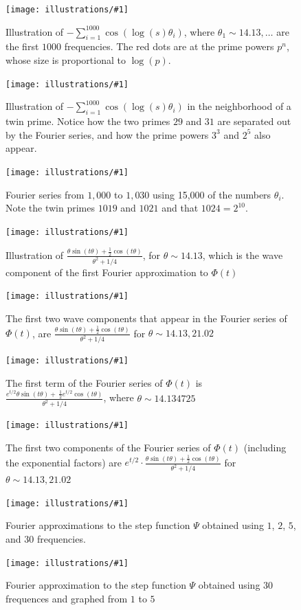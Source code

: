 \documentclass[11pt]{article}
\newcommand{\ill}[3]{ 
   \begin{figure}[H]
   \begin{center}
   \texttt{[image: illustrations/\#1]}
   \caption{#3}
   \end{center}
    \end{figure}
}
\theoremstyle{plain}
\theoremstyle{definition}
\numberwithin{equation}{section}
\numberwithin{figure}{section}
\numberwithin{table}{section}
\begin{document}
\begin{itemize}
{\bigskip

\ill{phi_cos_sum_2_30_1000}{.8}{Illustration of $-\sum_{i=1}^{1000} \cos(\log(s)\theta_i)$, where
$\theta_1 \sim 14.13, \ldots$ are the first $1000$ frequencies.  The red
dots are at the prime powers $p^n$, whose size is proportional to $\log(p)$.}

\ill{phi_cos_sum_26_34_1000}{.8}{Illustration of $-\sum_{i=1}^{1000} \cos(\log(s)\theta_i)$ in the
neighborhood of a twin prime.  Notice how the two primes $29$ and $31$ are separated out
by the Fourier series, and how the prime powers $3^3$ and $2^5$ also appear.}

\ill{phi_cos_sum_1010_1026_15000}{.7}{Fourier series from $1,000$ to $1,030$ using 15,000 of the numbers $\theta_i$.  Note the twin primes $1019$ and $1021$ and that $1024=2^{10}$.}

 

 
 \ill{psi_just_waves1}{0.7}{Illustration of 
$\displaystyle\frac{\theta\sin(t\theta) + \frac{1}{2}\cos(t\theta)}{\theta^2 + 1/4}$,
for $\theta\sim 14.13$,  which is the 
wave component of the first Fourier approximation to $\Phi(t)$}

\ill{psi_2_waves}{.7}{The first two wave components that appear in the Fourier series of $\Phi(t)$,
are $\frac{\theta\sin(t\theta) + \frac{1}{2}\cos(t\theta)}{\theta^2 + 1/4}$
for $\theta \sim 14.13, 21.02$}

\ill{psi_with_first_zero}{.5}{The first term of the Fourier series of $\Phi(t)$ is $\displaystyle  
          \frac{e^{t/2} \theta \sin(t\theta) + \
                    \frac{1}{2} e^{t/2} \cos(t\theta)}{\theta^2 + 1/4} $, 
          where $\theta \sim 14.134725$}
          
\ill{psi_with_exp_2}{.7}{The first two components of the Fourier series 
of $\Phi(t)$ (including the exponential factors) are
$e^{t/2} \cdot \frac{\theta\sin(t\theta) + \frac{1}{2}\cos(t\theta)}{\theta^2 + 1/4}$
for $\theta \sim 14.13, 21.02$}

\ill{psi_approx_1_2_5_30}{0.7}{Fourier approximations to the step function 
$\Psi$ obtained using $1$, $2$, $5$, and $30$ frequencies.}

\ill{psi_approx_using_30_zeros_from4to5}{0.7}{Fourier 
approximation to the step function $\Psi$ obtained using $30$
frequences and graphed from $1$ to $5$}

}
\end{itemize}
\end{document}

